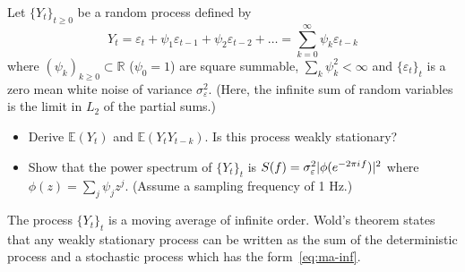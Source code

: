\documentclass[11pt]{article}
\begin{document}
\begin{exercise}[subtitle=Infinite order moving average MA($\infty$)]
Let $\{Y_t\}_{t\geq 0}$ be a random process defined by
\begin{equation}\label{eq:ma-inf}
    Y_t = \varepsilon_t + \psi_1 \varepsilon_{t-1} + \psi_2 \varepsilon_{t-2} + \dots = \sum_{k=0}^{\infty} \psi_k\varepsilon_{t-k}
\end{equation}
where $(\psi_k)_{k\geq0} \subset \mathbb{R}$ ($\psi_0=1$) are square summable, \ie $\sum_k \psi_k^2 < \infty$ and $\{\varepsilon_t\}_t$ is a zero mean white noise of variance $\sigma_\varepsilon^2$.
(Here, the infinite sum of random variables is the limit in $L_2$ of the partial sums.)
\begin{itemize}
    \item Derive $\mathbb{E}(Y_t)$ and $\mathbb{E}(Y_t Y_{t-k})$. Is this process weakly stationary?
    \item Show that the power spectrum of $\{Y_t\}_{t}$ is $S(f) = \sigma_\varepsilon^2 |\phi(e^{-2\pi{i\mkern1mu} f})|^2$ where $\phi(z) = \sum_j \psi_j z^j$. (Assume a sampling frequency of 1 Hz.)
\end{itemize}

The process $\{Y_t\}_{t}$ is a moving average of infinite order.
Wold's theorem states that any weakly stationary process can be written as the sum of the deterministic process and a stochastic process which has the form~\eqref{eq:ma-inf}.

\end{exercise}
\end{document}

